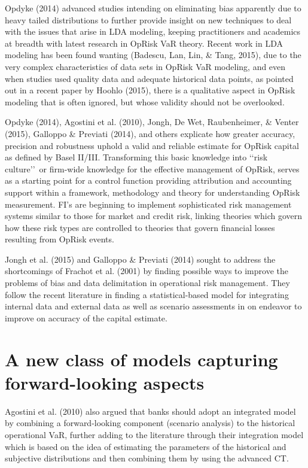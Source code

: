 \documentclass{DissertateUSU}
\begin{document}
Opdyke (2014) advanced studies intending on eliminating bias apparently
due to heavy tailed distributions to further provide insight on new
techniques to deal with the issues that arise in LDA modeling, keeping
practitioners and academics at breadth with latest research in OpRisk
VaR theory. Recent work in LDA modeling has been found wanting (Badescu,
Lan, Lin, \& Tang, 2015), due to the very complex characteristics of
data sets in OpRisk VaR modeling, and even when studies used quality
data and adequate historical data points, as pointed out in a recent
paper by Hoohlo (2015), there is a qualitative aspect in OpRisk modeling
that is often ignored, but whose validity should not be overlooked.
\medskip

Opdyke (2014), Agostini et al. (2010), Jongh, De Wet, Raubenheimer, \&
Venter (2015), Galloppo \& Previati (2014), and others explicate how
greater accuracy, precision and robustness uphold a valid and reliable
estimate for OpRisk capital as defined by Basel II/III. Transforming
this basic knowledge into \lq\lq risk culture\rq\rq~or firm-wide
knowledge for the effective management of OpRisk, serves as a starting
point for a control function providing attribution and accounting
support within a framework, methodology and theory for understanding
OpRisk measurement. FI's are beginning to implement sophisticated risk
management systems similar to those for market and credit risk, linking
theories which govern how these risk types are controlled to theories
that govern financial losses resulting from OpRisk events. \medskip

Jongh et al. (2015) and Galloppo \& Previati (2014) sought to address
the shortcomings of Frachot et al. (2001) by finding possible ways to
improve the problems of bias and data delimitation in operational risk
management. They follow the recent literature in finding a
statistical-based model for integrating internal data and external data
as well as scenario assessments in on endeavor to improve on accuracy of
the capital estimate.

\section{A new class of models capturing forward-looking aspects}
\label{sec:A new class of models capturing forward-looking aspects}

Agostini et al. (2010) also argued that banks should adopt an integrated
model by combining a forward-looking component (scenario analysis) to
the historical operational VaR, further adding to the literature through
their integration model which is based on the idea of estimating the
parameters of the historical and subjective distributions and then
combining them by using the advanced CT. \medskip
\end{document}
